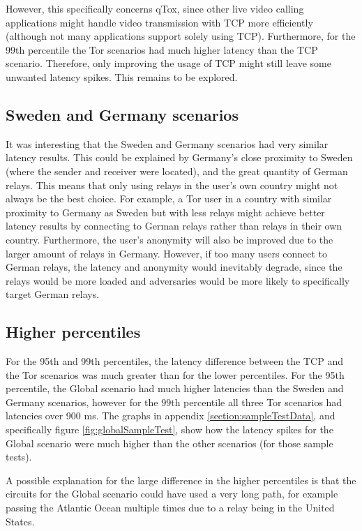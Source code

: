 \documentclass{kththesis}
\begin{document}
However, this specifically concerns qTox, since other live video calling applications might handle video transmission with TCP more efficiently (although not many applications support solely using TCP). Furthermore, for the 99th percentile the Tor scenarios had much higher latency than the TCP scenario. Therefore, only improving the usage of TCP might still leave some unwanted latency spikes. This remains to be explored.

\subsection{Sweden and Germany scenarios}
It was interesting that the Sweden and Germany scenarios had very similar latency results. This could be explained by Germany's close proximity to Sweden (where the sender and receiver were located), and the great quantity of German relays. This means that only using relays in the user's own country might not always be the best choice. For example, a Tor user in a country with similar proximity to Germany as Sweden but with less relays might achieve better latency results by connecting to German relays rather than relays in their own country. Furthermore, the user's anonymity will also be improved due to the larger amount of relays in Germany. However, if too many users connect to German relays, the latency and anonymity would inevitably degrade, since the relays would be more loaded and adversaries would be more likely to specifically target German relays.

\subsection{Higher percentiles}
For the 95th and 99th percentiles, the latency difference between the TCP and the Tor scenarios was much greater than for the lower percentiles. For the 95th percentile, the Global scenario had much higher latencies than the Sweden and Germany scenarios, however for the 99th percentile all three Tor scenarios had latencies over 900 ms. The graphs in appendix \ref{section:sampleTestData}, and specifically figure \ref{fig:globalSampleTest}, show how the latency spikes for the Global scenario were much higher than the other scenarios (for those sample tests). 

A possible explanation for the large difference in the higher percentiles is that the circuits for the Global scenario could have used a very long path, for example passing the Atlantic Ocean multiple times due to a relay being in the United States.
\end{document}
